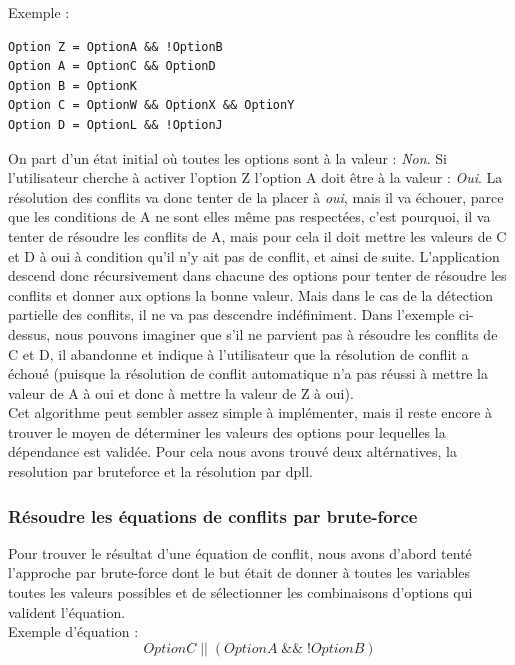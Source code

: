 \documentclass[17pts]{report}
\begin{document}
Exemple :
\begin{verbatim}
Option Z = OptionA && !OptionB
Option A = OptionC && OptionD
Option B = OptionK
Option C = OptionW && OptionX && OptionY
Option D = OptionL && !OptionJ
\end{verbatim}

On part d'un état initial où toutes les options sont à la valeur :
\textit{Non}.  Si l'utilisateur cherche à activer l'option Z l'option A doit
être à la valeur : \textit{Oui}. La résolution des conflits va donc tenter de
la placer à \textit{oui}, mais il va échouer, parce que les conditions de A ne
sont elles même pas respectées, c'est pourquoi, il va tenter de résoudre les
conflits de A, mais pour cela il doit mettre les valeurs de C et D à oui à
condition qu'il n'y ait pas de conflit, et ainsi de suite.  L'application
descend donc récursivement dans chacune des options pour tenter de résoudre les
conflits et donner aux options la bonne valeur. Mais dans le cas de la
détection partielle des conflits, il ne va pas descendre indéfiniment. Dans
l'exemple ci-dessus, nous pouvons imaginer que s'il ne parvient pas à résoudre
les conflits de C et D, il abandonne et indique à l'utilisateur que la
résolution de conflit a échoué (puisque la résolution de conflit automatique
n'a pas réussi à mettre la valeur de A à oui et donc à mettre la valeur de Z à
oui).  \\

Cet algorithme peut sembler assez simple à implémenter, mais il reste encore à
trouver le moyen de déterminer les valeurs des options pour lequelles la
dépendance est validée. Pour cela nous avons trouvé deux altérnatives, la
resolution par bruteforce et la résolution par dpll.


\subsubsection{Résoudre les équations de conflits par brute-force}
\label{sub:Résoudre les équations de conflits par brute-force}
Pour trouver le résultat d'une équation de conflit, nous avons d'abord tenté
l'approche par brute-force dont le but était de donner à toutes les variables
toutes les valeurs possibles et de sélectionner les combinaisons d'options qui
valident l'équation.  \\

Exemple d'équation :
\begin{equation}
OptionC\;||\;(OptionA\;\&\&\;!OptionB)
\end{equation}
\end{document}
